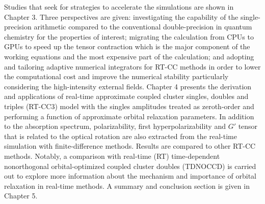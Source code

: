 Studies that seek for strategies to accelerate the simulations are shown in Chapter 3. Three perspectives are given: investigating the capability of the single-precision arithmetic compared to the conventional double-precision in quantum chemistry for the properties of interest; migrating the calculation from CPUs to GPUs to speed up the tensor contraction which is the major component of the working equations and the most expensive part of the calculation; and adopting and tailoring adaptive numerical integrators for RT-CC methods in order to lower the computational cost and improve the numerical stability particularly considering the high-intensity external fields. Chapter 4 presents the derivation and applications of real-time approximate coupled cluster singles, doubles and triples (RT-CC3) model with the singles amplitudes treated as zeroth-order and performing a function of  approximate orbital relaxation parameters. In addition to the absorption spectrum, polarizability, first hyperpolarizability and $G'$ tensor that is related to the optical rotation are also extracted from the real-time simulation with finite-difference methods.\cite{Ding2013} Results are compared to other RT-CC methods. Notably, a comparison with real-time (RT) time-dependent nonorthogonal orbital-optimized coupled cluster doubles (TDNOCCD)\cite{Krylov2000, Pedersen2001, Kristiansen2020} is carried out to explore more information about the mechanism and importance of orbital relaxation in real-time methods. A summary and conclusion section is given in Chapter 5. 